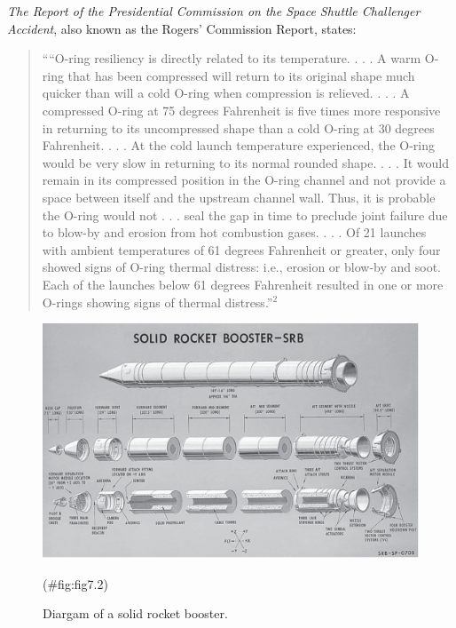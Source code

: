 \documentclass[
]{report}
\begin{document}
\emph{The Report of the Presidential Commission on the Space Shuttle Challenger Accident}, also known as the Rogers' Commission Report, states:

\begin{quote}
````O-ring resiliency is directly related to its temperature. . . . A warm O-ring that has been compressed
will return to its original shape much quicker than will a cold O-ring when compression is relieved.
. . . A compressed O-ring at 75 degrees Fahrenheit is five times more responsive in returning to its
uncompressed shape than a cold O-ring at 30 degrees Fahrenheit. . . . At the cold launch temperature
experienced, the O-ring would be very slow in returning to its normal rounded shape. . . . It would
remain in its compressed position in the O-ring channel and not provide a space between itself and the
upstream channel wall. Thus, it is probable the O-ring would not . . . seal the gap in time to preclude
joint failure due to blow-by and erosion from hot combustion gases. . . . Of 21 launches with ambient
temperatures of 61 degrees Fahrenheit or greater, only four showed signs of O-ring thermal distress:
i.e., erosion or blow-by and soot. Each of the launches below 61 degrees Fahrenheit resulted in one
or more O-rings showing signs of thermal distress.''\(^2\)
\end{quote}

\begin{figure}

{\centering \includegraphics[width=1\linewidth]{docs/Fig7_2Rocket2} 

}

\caption{Diargam of a solid rocket booster.}(\#fig:fig7.2)
\end{figure}
\end{document}
